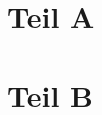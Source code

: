 \documentclass[ngerman]{schulexam}
\begin{document}
\worksheetheader

\section*{Teil A}


\section*{Teil B}
\end{document}
